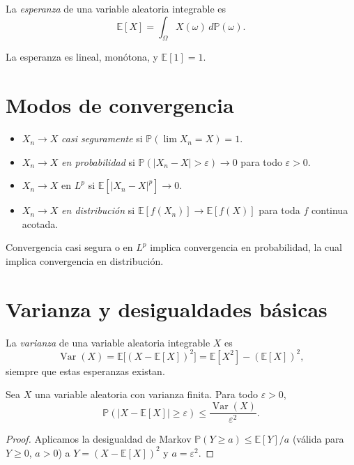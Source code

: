 \begin{definition}
\label{def:esperanza}
La \emph{esperanza} de una variable aleatoria integrable es
\[
  \mathbb{E}[X]=\int_{\Omega}X(\omega)\,d\mathbb{P}(\omega).
\]
\end{definition}

\begin{theorem}[Propiedades]
\label{teo:prop-esperanza}
La esperanza es lineal, monótona, y $\mathbb{E}[1]=1$.
\end{theorem}

\section{Modos de convergencia}

\begin{definition}
\label{def:convergencias-probabilidad}
\begin{itemize}
  \item $X_n\to X$ \emph{casi seguramente} si $\mathbb{P}(\lim X_n=X)=1$.
  \item $X_n\to X$ \emph{en probabilidad} si $\mathbb{P}(|X_n-X|>\varepsilon)\to 0$ para todo $\varepsilon>0$.
  \item $X_n\to X$ en $L^p$ si $\mathbb{E}[|X_n-X|^p]\to 0$.
  \item $X_n\to X$ \emph{en distribución} si $\mathbb{E}[f(X_n)]\to\mathbb{E}[f(X)]$ para toda $f$ continua acotada.
\end{itemize}
\end{definition}

\begin{proposition}
\label{prop:implicaciones-convergencia}
Convergencia casi segura o en $L^p$ implica convergencia en probabilidad, la cual implica convergencia en distribución.
\end{proposition}

\section{Varianza y desigualdades básicas}

\begin{definition}
\label{def:varianza}
La \emph{varianza} de una variable aleatoria integrable $X$ es
\[
  \operatorname{Var}(X)=\mathbb{E}\bigl[(X-\mathbb{E}[X])^2\bigr]=\mathbb{E}[X^2]-(\mathbb{E}[X])^2,
\]
siempre que estas esperanzas existan.
\end{definition}

\begin{theorem}
\label{teo:chebyshev}
Sea $X$ una variable aleatoria con varianza finita. Para todo $\varepsilon>0$,
\[
  \mathbb{P}(|X-\mathbb{E}[X]|\geq\varepsilon)\leq\frac{\operatorname{Var}(X)}{\varepsilon^2}.
\]
\end{theorem}
\begin{proof}
Aplicamos la desigualdad de Markov $\mathbb{P}(Y\geq a)\leq\mathbb{E}[Y]/a$ (válida para $Y\geq 0$, $a>0$) a $Y=(X-\mathbb{E}[X])^2$ y $a=\varepsilon^2$.
\end{proof}

